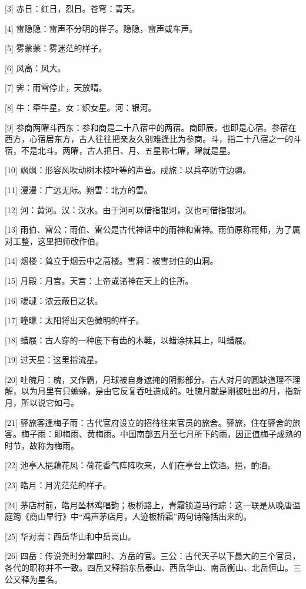 \documentclass[12pt,UTF8]{ctexbook}
\begin{document}
[3] 赤日：红日，烈日。苍穹：青天。

[4] 雷隐隐：雷声不分明的样子。隐隐，雷声或车声。

[5] 雾蒙蒙：雾迷茫的样子。

[6] 风高：风大。

[7] 霁：雨雪停止，天放晴。

[8] 牛：牵牛星。女：织女星。河：银河。

[9] 参商两曜斗西东：参和商是二十八宿中的两宿。商即辰，也即是心宿。参宿在西方，心宿居东方，古人往往把亲友久别难逢比为参商。斗，指二十八宿之一的斗宿，不是北斗。两曜，古人把日、月、五星称七曜，曜就是星。

[10] 飒飒：形容风吹动树木枝叶等的声音。戍旅：以兵卒防守边疆。

[11] 漫漫：广远无际。朔雪：北方的雪。

[12] 河：黄河。汉：汉水。由于河可以借指银河，汉也可借指银河。

[13] 雨伯、雷公：雨伯、雷公是古代神话中的雨神和雷神。雨伯原称雨师，为了属对工整，这里把师改作伯。

[14] 烟楼：耸立于烟云中之高楼。雪洞：被雪封住的山洞。

[15] 月殿：月宫。天宫：上帝或诸神在天上的住所。

[16] 叆叇：浓云蔽日之状。

[17] 曈曚：太阳将出天色微明的样子。

[18] 蜡屐：古人穿的一种底下有齿的木鞋，以蜡涂抹其上，叫蜡屐。

[19] 过天星：这里指流星。

[20] 吐魄月：魄，又作霸，月球被自身遮掩的阴影部分。古人对月的圆缺道理不理解，以为月里有只蟾蜍，是由它反复吞吐造成的。吐魄月就是刚被吐出的月，指新月，所以说它如弓。

[21] 驿旅客逢梅子雨：古代官府设立的招待往来官员的旅舍。驿旅，住在驿舍的旅客。梅子雨：即梅雨、黄梅雨。中国南部五月至七月所下的雨，因正值梅子成熟的时节，故称为梅雨。

[22] 池亭人挹藕花风：荷花香气阵阵吹来，人们在亭台上饮酒。挹，酌酒。

[23] 皓月：月光茫茫的样子。

[24] 茅店村前，皓月坠林鸡唱韵；板桥路上，青霜锁道马行踪：这一联是从晚唐温庭筠《商山早行》中“鸡声茅店月，人迹板桥霜”两句诗隐括出来的。

[25] 华对嵩：西岳华山和中岳嵩山。

[26] 四岳：传说尧时分掌四时、方岳的官。三公：古代天子以下最大的三个官员，各代的职称并不一致。四岳又释指东岳泰山、西岳华山、南岳衡山、北岳恒山。三公又释为星名。
\end{document}
